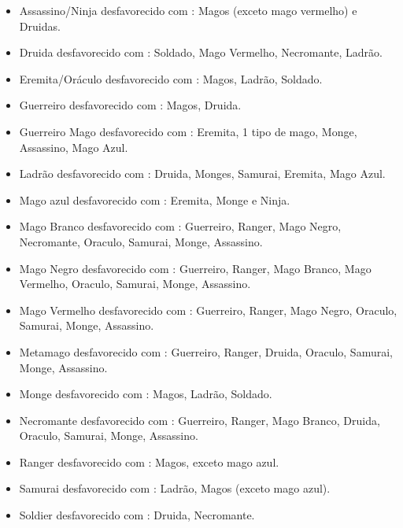 \begin{itemize}
	\item Assassino/Ninja desfavorecido com : Magos (exceto mago vermelho) e Druidas.

	\item Druida desfavorecido com : Soldado, Mago Vermelho, Necromante, Ladrão.

	\item Eremita/Oráculo desfavorecido com : Magos, Ladrão, Soldado.

	\item Guerreiro desfavorecido com : Magos, Druida.

	\item Guerreiro Mago desfavorecido com : Eremita, 1 tipo de mago, Monge, Assassino, Mago Azul.

	\item Ladrão desfavorecido com : Druida, Monges, Samurai, Eremita, Mago Azul.

	\item Mago azul desfavorecido com : Eremita, Monge e Ninja.

	\item Mago Branco desfavorecido com : Guerreiro, Ranger, Mago Negro, Necromante, Oraculo, Samurai, Monge, Assassino.
	
	\item Mago Negro desfavorecido com : Guerreiro, Ranger, Mago Branco, Mago Vermelho, Oraculo, Samurai, Monge, Assassino.
	
	\item Mago Vermelho desfavorecido com : Guerreiro, Ranger, Mago Negro, Oraculo, Samurai, Monge, Assassino.
	
	\item Metamago desfavorecido com : Guerreiro, Ranger, Druida, Oraculo, Samurai, Monge, Assassino.
	
	\item Monge desfavorecido com : Magos, Ladrão, Soldado.

	\item Necromante desfavorecido com : Guerreiro, Ranger, Mago Branco, Druida, Oraculo, Samurai, Monge, Assassino.

	\item Ranger desfavorecido com : Magos, exceto mago azul.

	\item Samurai desfavorecido com : Ladrão, Magos (exceto mago azul).
	
	\item Soldier desfavorecido com : Druida, Necromante.
	
\end{itemize}

